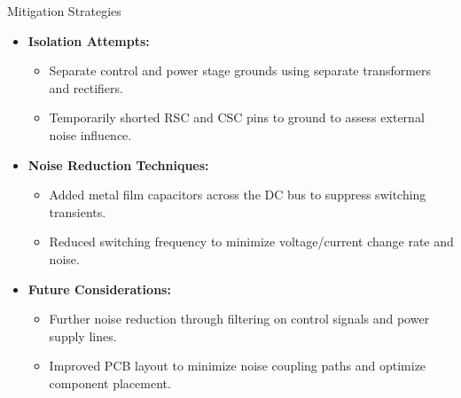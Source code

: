 \begin{frame}{Mitigation Strategies}

	\begin{itemize}
		\item \textbf{Isolation Attempts:}
		      \begin{itemize}
			      \item Separate control and power stage grounds using separate transformers and rectifiers.
			      \item Temporarily shorted RSC and CSC pins to ground to assess external noise influence.
		      \end{itemize}
		\item \textbf{Noise Reduction Techniques:}
		      \begin{itemize}
			      \item Added metal film capacitors across the DC bus to suppress switching transients.
			      \item Reduced switching frequency to minimize voltage/current change rate and noise.
		      \end{itemize}
		\item \textbf{Future Considerations:}
		      \begin{itemize}
			      \item Further noise reduction through filtering on control signals and power supply lines.
			      \item Improved PCB layout to minimize noise coupling paths and optimize component placement.
		      \end{itemize}
	\end{itemize}

\end{frame}

